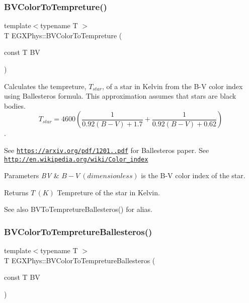 \subsubsection{\texorpdfstring{B\+V\+Color\+To\+Tempreture()}{BVColorToTempreture()}}
{\footnotesize\ttfamily template$<$typename T $>$ \\
T E\+G\+X\+Phys\+::\+B\+V\+Color\+To\+Tempreture (\begin{DoxyParamCaption}\item[{const T}]{BV }\end{DoxyParamCaption})}



Calculates the tempreture, $T_{star}$, of a star in Kelvin from the B-\/V color index using Ballesteros\textquotesingle{} formula. This approximation assumes that stars are black bodies. \[T_{star}=4600 \left ( \frac{1}{0.92 (B-V)+ 1.7} + \frac{1}{0.92 (B-V) + 0.62} \right )\]. 

See \href{https://arxiv.org/pdf/1201.1809.pdf}{\tt https\+://arxiv.\+org/pdf/1201..\+pdf} for Ballesteros\textquotesingle{} paper. See \href{http://en.wikipedia.org/wiki/Color_index}{\tt http\+://en.\+wikipedia.\+org/wiki/\+Color\+\_\+index}


\begin{DoxyParams}{Parameters}
{\em BV} & $B-V\ (dimensionless)$ is the B-\/V color index of the star. \\
\hline
\end{DoxyParams}
\begin{DoxyReturn}{Returns}
$T\ (K)$ Tempreture of the star in Kelvin. 
\end{DoxyReturn}
\begin{DoxySeeAlso}{See also}
B\+V\+To\+Tempreture\+Ballesteros() for alias. 
\end{DoxySeeAlso}
\mbox{\label{group___e_g_x_phys-_b-_v_color_ga0e553143a3bb121c3ae50ca96c502140}} 
\subsubsection{\texorpdfstring{B\+V\+Color\+To\+Tempreture\+Ballesteros()}{BVColorToTempretureBallesteros()}}
{\footnotesize\ttfamily template$<$typename T $>$ \\
T E\+G\+X\+Phys\+::\+B\+V\+Color\+To\+Tempreture\+Ballesteros (\begin{DoxyParamCaption}\item[{const T}]{BV }\end{DoxyParamCaption})}



